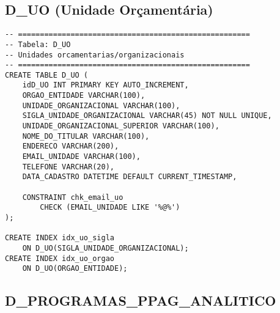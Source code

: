 \documentclass[12pt,a4paper]{article}
\begin{document}
\subsection{D\_UO (Unidade Orçamentária)}

\begin{lstlisting}
-- =====================================================
-- Tabela: D_UO
-- Unidades orcamentarias/organizacionais
-- =====================================================
CREATE TABLE D_UO (
    idD_UO INT PRIMARY KEY AUTO_INCREMENT,
    ORGAO_ENTIDADE VARCHAR(100),
    UNIDADE_ORGANIZACIONAL VARCHAR(100),
    SIGLA_UNIDADE_ORGANIZACIONAL VARCHAR(45) NOT NULL UNIQUE,
    UNIDADE_ORGANIZACIONAL_SUPERIOR VARCHAR(100),
    NOME_DO_TITULAR VARCHAR(100),
    ENDERECO VARCHAR(200),
    EMAIL_UNIDADE VARCHAR(100),
    TELEFONE VARCHAR(20),
    DATA_CADASTRO DATETIME DEFAULT CURRENT_TIMESTAMP,
    
    CONSTRAINT chk_email_uo 
        CHECK (EMAIL_UNIDADE LIKE '%@%')
);

CREATE INDEX idx_uo_sigla 
    ON D_UO(SIGLA_UNIDADE_ORGANIZACIONAL);
CREATE INDEX idx_uo_orgao 
    ON D_UO(ORGAO_ENTIDADE);
\end{lstlisting}

\subsection{D\_PROGRAMAS\_PPAG\_ANALITICO}
\end{document}
